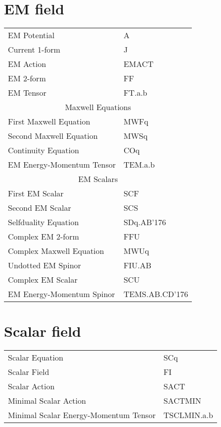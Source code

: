 \documentclass[twoside,openright]{report}
\newcommand{\grgtt}{\ttfamily}
\renewcommand{\tt}{\grgtt}
\newcommand{\cc}{{\tt \char'176}}           %
\begin{document}
\begin{center}
\section{EM field}
\begin{tabular}{|l|l|}\hline
\tt    EM Potential    &\tt    A\\
\tt    Current 1-form  &\tt    J\\
\tt    EM Action       &\tt    EMACT\\
\tt    EM 2-form       &\tt    FF\\
\tt    EM Tensor       &\tt    FT.a.b\\
\hline
\multicolumn{2}{|c|}{\tt    Maxwell Equations}\\
\tt    First Maxwell Equation    &\tt    MWFq\\
\tt    Second Maxwell Equation   &\tt    MWSq\\
\hline
\tt    Continuity Equation       &\tt  COq\\
\tt    EM Energy-Momentum Tensor &\tt  TEM.a.b\\
\hline
\multicolumn{2}{|c|}{\tt    EM Scalars}\\
\tt    First EM Scalar         &\tt      SCF\\
\tt    Second EM Scalar        &\tt      SCS\\
\hline
\tt    Selfduality Equation    &\tt    SDq.AB\cc\\
\tt    Complex EM 2-form        &\tt   FFU\\
\tt    Complex Maxwell Equation &\tt   MWUq\\
\tt    Undotted EM Spinor       &\tt   FIU.AB\\
\tt    Complex EM Scalar        &\tt   SCU\\
\tt    EM Energy-Momentum Spinor &\tt  TEMS.AB.CD\cc\\
\hline\end{tabular}

\section{Scalar field}
\begin{tabular}{|l|l|}\hline
\tt    Scalar Equation       &\tt  SCq\\
\tt    Scalar Field          &\tt  FI\\
\tt    Scalar Action         &\tt  SACT\\
\tt    Minimal Scalar Action &\tt  SACTMIN\\
\tt    Minimal Scalar Energy-Momentum Tensor &\tt  TSCLMIN.a.b\\
\hline\end{tabular}



\end{center}
\end{document}
